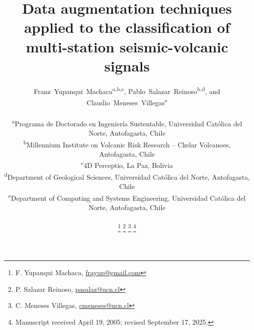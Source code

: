 \documentclass[journal]{IEEEtran}
\begin{document}
%
\title{Data augmentation techniques applied to the classification of multi-station seismic-volcanic signals}
%
%
%

\author{Franz~Yupanqui~Machaca\textsuperscript{a,b,c}, Pablo~Salazar~Reinoso\textsuperscript{b,d}, and
  Claudio~Meneses~Villegas\textsuperscript{e}\\
  \vspace{1mm}
  \begin{flushleft}
  \small\textsuperscript{a}Programa de Doctorado en Ingeniería Sustentable, Universidad Católica del Norte, Antofagasta, Chile\\
  \textsuperscript{b}Millennium Institute on Volcanic Risk Research – Ckelar Volcanoes, Antofagasta, Chile\\
  \textsuperscript{c}4D Perceptio, La Paz, Bolivia\\
  \textsuperscript{d}Department of Geological Sciences, Universidad Católica del Norte, Antofagasta, Chile\\
  \textsuperscript{e}Department of Computing and Systems Engineering, Universidad Católica del Norte, Antofagasta, Chile\\
  \end{flushleft}
  \thanks{F. Yupanqui Machaca, \color{blue}\href{mailto:frayup@gmail.com}{frayup@gmail.com} }
  \thanks{P. Salazar Reinoso, \color{blue}\href{mailto:pasalaz@ucn.cl}{pasalaz@ucn.cl} }
  \thanks{C. Meneses Villegas, \color{blue}\href{mailto:cmeneses@ucn.cl}{cmeneses@ucn.cl} }
  \thanks{Manuscript received April 19, 2005; revised September 17, 2025.}
}
\end{document}
